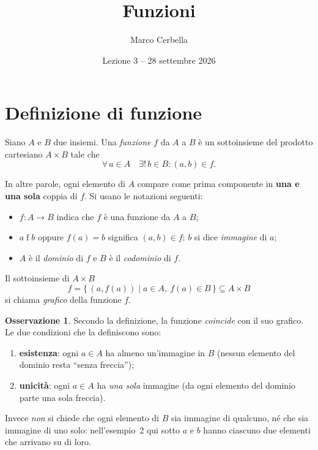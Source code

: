 \documentclass[11pt,a4paper]{article}
\title{Funzioni}
\author{Marco Cerbella}
\date{Lezione 3 -- 28 settembre 2026}
\theoremstyle{definition}
\newtheorem*{osservazione}{Osservazione}
\begin{document}
\maketitle

\section{Definizione di funzione}

\begin{definizione}
Siano $A$ e $B$ due insiemi. Una \emph{funzione} $f$ da $A$ a $B$ è un
sottoinsieme del prodotto cartesiano $A \times B$ tale che
\[
\forall\, a \in A \quad \exists!\, b \in B : (a, b) \in f.
\]
\end{definizione}

In altre parole, ogni elemento di $A$ compare come prima componente in
\textbf{una e una sola} coppia di $f$. Si usano le notazioni seguenti:
\begin{itemize}
    \item $f : A \to B$ indica che $f$ è una funzione da $A$ a $B$;
    \item $a \mathrel{f} b$ oppure $f(a) = b$ significa $(a, b) \in f$;
          $b$ si dice \emph{immagine} di $a$;
    \item $A$ è il \emph{dominio} di $f$ e $B$ è il \emph{codominio} di $f$.
\end{itemize}

Il sottoinsieme di $A \times B$
\[
f = \{\, (a, f(a)) \mid a \in A,\ f(a) \in B \,\} \subseteq A \times B
\]
si chiama \emph{grafico} della funzione $f$.

\begin{osservazione}
Secondo la definizione, la funzione \emph{coincide} con il suo grafico.
Le due condizioni che la definiscono sono:
\begin{enumerate}
    \item \textbf{esistenza}: ogni $a \in A$ ha almeno un'immagine in $B$
          (nessun elemento del dominio resta ``senza freccia'');
    \item \textbf{unicità}: ogni $a \in A$ ha \emph{una sola} immagine
          (da ogni elemento del dominio parte una sola freccia).
\end{enumerate}
Invece \emph{non} si chiede che ogni elemento di $B$ sia immagine di
qualcuno, né che sia immagine di uno solo: nell'esempio~2 qui sotto $a$ e
$b$ hanno ciascuno due elementi che arrivano su di loro.
\end{osservazione}
\end{document}
